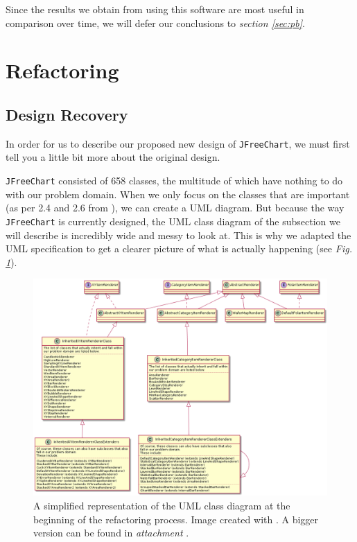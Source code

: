 \documentclass[11pt]{article}
\begin{document}
	Since the results we obtain from using this software are most useful in comparison over time, we will defer our conclusions to \textsl{section \ref{sec:pb}}.
	
	
	\section{Refactoring}
	\subsection{Design Recovery}
	In order for us to describe our proposed new design of \texttt{JFreeChart}, we must first tell you a little bit more about the original design.
	
	\texttt{JFreeChart} consisted of 658 classes, the multitude of which have nothing to do with our problem domain. When we only focus on the classes that are important (as per 2.4 and 2.6 from \cite{demeyer2009object}), we can create a UML diagram. But because the way \texttt{JFreeChart} is currently designed, the UML class diagram of the subsection we will describe is incredibly wide and messy to look at. This is why we adapted the UML specification to get a clearer picture of what is actually happening (see \textsl{Fig.\,\ref{fig:UML-start}}).
	
	\begin{figure}[H]
		\centering
		\includegraphics[scale=0.3]{pictures/class-diagram-begin.png}
		\caption{A simplified representation of the UML class diagram at the beginning of the refactoring process. Image created with \cite{plantuml}. A bigger version can be found in \textsl{attachment \pageref{class-diagram-begin}}.}
		\label{fig:UML-start}
	\end{figure}
	
\end{document}
